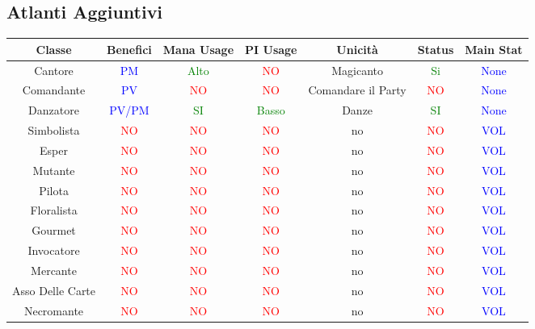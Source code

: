 \documentclass{article}
\begin{document}
\subsection{Atlanti Aggiuntivi}
  \begin{table}[h]
    \center
    \begin{tabular}{|c|c|c|c|c|c|c|}
      \hline
      \textbf{Classe} & \textbf{Benefici} & \textbf{Mana Usage} & \textbf{PI Usage}  & \textbf{Unicità} & \textbf{Status} & \textbf{Main Stat}\\
      \hline
      \centering Cantore  & \textcolor{blue}{PM}   & \textcolor{green}{Alto} & \textcolor{red}{NO} & Magicanto & \textcolor{green}{Si} &\textcolor{blue}{None} \\
      \hline
      \centering Comandante  & \textcolor{blue}{PV}   & \textcolor{red}{NO} & \textcolor{red}{NO} & Comandare il Party & \textcolor{red}{NO} &\textcolor{blue}{None} \\
      \hline
      \centering Danzatore & \textcolor{blue}{PV/PM}   & \textcolor{green}{SI} & \textcolor{green}{Basso} & Danze & \textcolor{green}{SI} &\textcolor{blue}{None} \\
      \hline
      \centering Simbolista& \textcolor{red}{NO}   & \textcolor{red}{NO} & \textcolor{red}{NO} & no & \textcolor{red}{NO} &\textcolor{blue}{VOL} \\
      \hline
      \centering Esper  & \textcolor{red}{NO}   & \textcolor{red}{NO} & \textcolor{red}{NO} & no & \textcolor{red}{NO} &\textcolor{blue}{VOL} \\
      \hline
      \centering Mutante  & \textcolor{red}{NO}   & \textcolor{red}{NO} & \textcolor{red}{NO} & no & \textcolor{red}{NO} &\textcolor{blue}{VOL} \\
      \hline
      \centering Pilota & \textcolor{red}{NO}   & \textcolor{red}{NO} & \textcolor{red}{NO} & no & \textcolor{red}{NO} &\textcolor{blue}{VOL} \\
      \hline
      \centering Floralista& \textcolor{red}{NO}   & \textcolor{red}{NO} & \textcolor{red}{NO} & no & \textcolor{red}{NO} &\textcolor{blue}{VOL} \\
      \hline
      \centering Gourmet  & \textcolor{red}{NO}   & \textcolor{red}{NO} & \textcolor{red}{NO} & no & \textcolor{red}{NO} &\textcolor{blue}{VOL} \\
      \hline
      \centering Invocatore  & \textcolor{red}{NO}   & \textcolor{red}{NO} & \textcolor{red}{NO} & no & \textcolor{red}{NO} &\textcolor{blue}{VOL} \\
      \hline
      \centering Mercante& \textcolor{red}{NO}   & \textcolor{red}{NO} & \textcolor{red}{NO} & no & \textcolor{red}{NO} &\textcolor{blue}{VOL} \\
      \hline
      \centering Asso Delle Carte& \textcolor{red}{NO}   & \textcolor{red}{NO} & \textcolor{red}{NO} & no & \textcolor{red}{NO} &\textcolor{blue}{VOL} \\
      \hline
      \centering Necromante& \textcolor{red}{NO}   & \textcolor{red}{NO} & \textcolor{red}{NO} & no & \textcolor{red}{NO} &\textcolor{blue}{VOL} \\
      \hline
    \end{tabular}
  \end{table}
\end{document}
